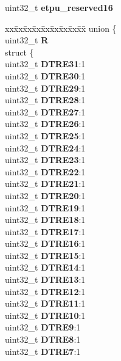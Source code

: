 \begin{DoxyCompactItemize}
\begin{tabbing}
\end{tabbing}\item 
\mbox{\label{structETPU__tag_abfa7c3711a47dcff93fc777880016761}} 
uint32\+\_\+t {\bfseries etpu\+\_\+reserved16}
\item 
\mbox{\label{structETPU__tag_a58f722d8d17d83b9abb0b91fadf0f9e6}} 
\begin{tabbing}
xx\=xx\=xx\=xx\=xx\=xx\=xx\=xx\=xx\=\kill
union \{\\
\>uint32\_t {\bfseries R}\\
\>struct \{\\
\>\>uint32\_t {\bfseries DTRE31}:1\\
\>\>uint32\_t {\bfseries DTRE30}:1\\
\>\>uint32\_t {\bfseries DTRE29}:1\\
\>\>uint32\_t {\bfseries DTRE28}:1\\
\>\>uint32\_t {\bfseries DTRE27}:1\\
\>\>uint32\_t {\bfseries DTRE26}:1\\
\>\>uint32\_t {\bfseries DTRE25}:1\\
\>\>uint32\_t {\bfseries DTRE24}:1\\
\>\>uint32\_t {\bfseries DTRE23}:1\\
\>\>uint32\_t {\bfseries DTRE22}:1\\
\>\>uint32\_t {\bfseries DTRE21}:1\\
\>\>uint32\_t {\bfseries DTRE20}:1\\
\>\>uint32\_t {\bfseries DTRE19}:1\\
\>\>uint32\_t {\bfseries DTRE18}:1\\
\>\>uint32\_t {\bfseries DTRE17}:1\\
\>\>uint32\_t {\bfseries DTRE16}:1\\
\>\>uint32\_t {\bfseries DTRE15}:1\\
\>\>uint32\_t {\bfseries DTRE14}:1\\
\>\>uint32\_t {\bfseries DTRE13}:1\\
\>\>uint32\_t {\bfseries DTRE12}:1\\
\>\>uint32\_t {\bfseries DTRE11}:1\\
\>\>uint32\_t {\bfseries DTRE10}:1\\
\>\>uint32\_t {\bfseries DTRE9}:1\\
\>\>uint32\_t {\bfseries DTRE8}:1\\
\>\>uint32\_t {\bfseries DTRE7}:1\\

\end{tabbing}
\end{DoxyCompactItemize}
